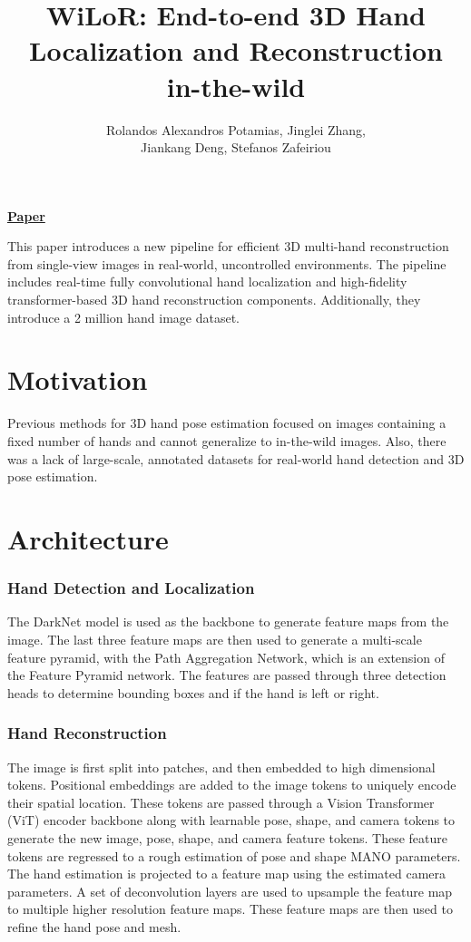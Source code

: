 \documentclass{article}
\title{WiLoR: End-to-end 3D Hand Localization and Reconstruction in-the-wild}
\author{Rolandos Alexandros Potamias, Jinglei Zhang, \\ Jiankang Deng, Stefanos Zafeiriou}
\date{}
\begin{document}
\maketitle

\begin{center}\textbf{\href{https://arxiv.org/pdf/2409.12259}{Paper}}\end{center}

This paper introduces a new pipeline for efficient 3D multi-hand reconstruction from single-view images in real-world, uncontrolled environments. The pipeline includes real-time fully convolutional hand localization and high-fidelity transformer-based 3D hand reconstruction components. Additionally, they introduce a 2 million hand image dataset.

\section*{Motivation}

Previous methods for 3D hand pose estimation focused on images containing a fixed number of hands and cannot generalize to in-the-wild images. Also, there was a lack of large-scale, annotated datasets for real-world hand detection and 3D pose estimation.

\section*{Architecture}

\subsubsection*{Hand Detection and Localization}

The DarkNet model is used as the backbone to generate feature maps from the image. The last three feature maps are then used to generate a multi-scale feature pyramid, with the Path Aggregation Network, which is an extension of the Feature Pyramid network. The features are passed through three detection heads to determine bounding boxes and if the hand is left or right.

\subsubsection*{Hand Reconstruction}

The image is first split into patches, and then embedded to high dimensional tokens. Positional embeddings are added to the image tokens to uniquely encode their spatial location. These tokens are passed through a Vision Transformer (ViT) encoder backbone along with learnable pose, shape, and camera tokens to generate the new image, pose, shape, and camera feature tokens. These feature tokens are regressed to a rough estimation of pose and shape MANO parameters. The hand estimation is projected to a feature map using the estimated camera parameters. A set of deconvolution layers are used to upsample the feature map to multiple higher resolution feature maps. These feature maps are then used to refine the hand pose and mesh.
\end{document}
